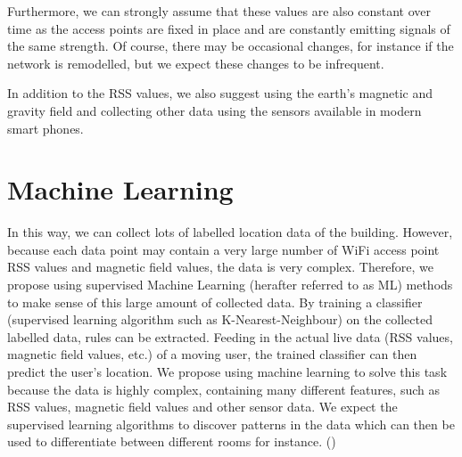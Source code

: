 Furthermore, we can strongly assume that these values are also constant over time as the access points are fixed in place and are constantly emitting signals of the same strength. Of course, there may be occasional changes, for instance if the network is remodelled, but we expect these changes to be infrequent. 

In addition to the RSS values, we also suggest using the earth's magnetic and gravity field and collecting other data using the sensors available in modern smart phones.


\section{Machine Learning}
In this way, we can collect lots of labelled location data of the building. However, because each data point may contain a very large number of WiFi access point RSS values and magnetic field values, the data is very complex. Therefore, we propose using supervised Machine Learning (herafter referred to as ML) methods to make sense of this large amount of collected data. By training a classifier (supervised learning algorithm such as K-Nearest-Neighbour) on the collected labelled data, rules can be extracted. Feeding in the actual live data (RSS values, magnetic field values, etc.) of a moving user, the trained classifier can then predict the user's location. We propose using machine learning to solve this task because the data is highly complex, containing many different features, such as RSS values, magnetic field values and other sensor data. We expect the supervised learning algorithms to discover patterns in the data which can then be used to differentiate between different rooms for instance. (\cite{machine_learning_indoor_localization, lips})

